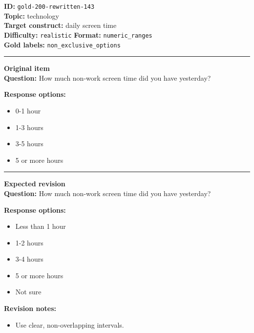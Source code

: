 \documentclass[10pt,a4paper]{article}
\newcommand{\sectionline}{\vspace{0.15em}\hrule\vspace{0.35em}}
\begin{document}
\begin{tcolorbox}[colframe=FlawRed,colback=white,colbacktitle=FlawRed!9,coltitle=black,title={Item 143\hfill Flawed item}]
\textbf{ID:} \texttt{gold-200-rewritten-143}\\
\textbf{Topic:} technology\\
\textbf{Target construct:} daily screen time\\
\textbf{Difficulty:} \texttt{realistic} \quad \textbf{Format:} \texttt{numeric\_ranges}\\
\textbf{Gold labels:} \texttt{non\_exclusive\_options}\\
\sectionline
\textbf{Original item}\\
\textbf{Question:} How much non-work screen time did you have yesterday?
\par\textbf{Response options:}
\begin{itemize}
\item 0-1 hour
\item 1-3 hours
\item 3-5 hours
\item 5 or more hours
\end{itemize}
\sectionline
\textbf{Expected revision}\\
\textbf{Question:} How much non-work screen time did you have yesterday?
\par\textbf{Response options:}
\begin{itemize}
\item Less than 1 hour
\item 1-2 hours
\item 3-4 hours
\item 5 or more hours
\item Not sure
\end{itemize}
\par\textbf{Revision notes:}
\begin{itemize}
\item Use clear, non-overlapping intervals.
\end{itemize}
\end{tcolorbox}
\end{document}

